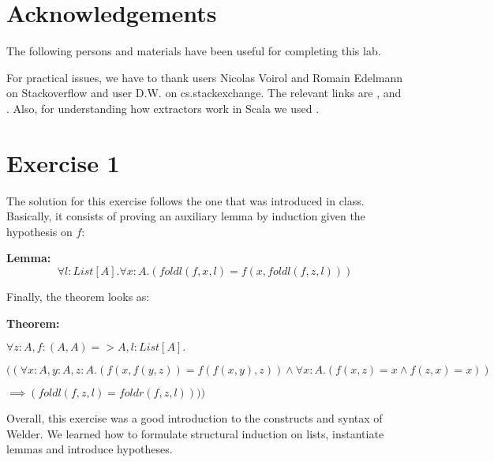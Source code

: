 \documentclass{article}
\begin{document}
\makeatletter\renewcommand{\ALG@name}{Algoritmo}

\maketitle



\newpage

\section{Acknowledgements}

The following persons and materials have been useful for completing this lab. 

For practical issues, we have to thank users Nicolas Voirol and Romain Edelmann on Stackoverflow and user D.W. on cs.stackexchange. The relevant links are \cite{strong-induction},\cite{proofs-sets} and \cite{formally}. Also, for understanding how extractors work in Scala we used \cite{matching}. 

\section*{Exercise 1}

The solution for this exercise follows the one that was introduced in class. Basically, it consists of proving an auxiliary lemma by induction given the hypothesis on $f$:

\textbf{Lemma:} $$\forall l: List[A]. \forall x: A. (foldl(f, x, l) = f(x, foldl(f, z, l)))$$

Finally, the theorem looks as:

\textbf{Theorem:} 

$\forall z: A, f: (A, A) => A, l: List[A].$

$((\forall x: A, y: A, z: A. (f(x, f(y, z)) = f(f(x, y), z)) \land \forall x: A. (f(x, z) = x \land f(z, x) = x))$ 

$\implies (foldl(f, z, l) = foldr(f, z, l))))$



Overall, this exercise was a good introduction to the constructs and syntax of Welder. We learned how to formulate structural induction on lists, instantiate lemmas and introduce hypotheses. 
\end{document}
